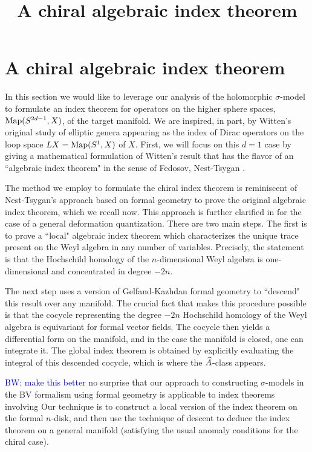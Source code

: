 \documentclass[10pt]{amsart}
\title{A chiral algebraic index theorem}
\def\brian{\textcolor{blue}{BW: }\textcolor{blue}}
\begin{document}
\maketitle

\section{A chiral algebraic index theorem}

In this section we would like to leverage our analysis of the holomorphic $\sigma$-model to formulate an index theorem for operators on the higher sphere spaces, ${\rm Map}(S^{2d-1}, X)$, of the target manifold. 
We are inspired, in part, by Witten's original study of elliptic genera appearing as the index of Dirac operators on the loop space $LX = {\rm Map}(S^1, X)$ of $X$\cite{WittenDirac,WittenElliptic}.
First, we will focus on this $d = 1$ case by giving a mathematical formulation of Witten's result that has the flavor of an ``algebraic index theorem" in the sense of Fedosov, Nest-Tsygan \cite{Fedosov, NestTsygan}. 

The method we employ to formulate the chiral index theorem is reminiscent of Nest-Tsygan's \cite{NestTsygan} approach based on formal geometry to prove the original algebraic index theorem, which we recall now. 
This approach is further clarified in \cite{FFS} for the case of a general deformation quantization. 
There are two main steps.
The first is to prove a ``local" algebraic index theorem which characterizes the unique trace present on the Weyl algebra in any number of variables.
Precisely, the statement is that the Hochschild homology of the $n$-dimensional Weyl algebra is one-dimensional and concentrated in degree $-2n$. 

The next step uses a version of Gelfand-Kazhdan formal geometry to ``descend" this result over any manifold. 
The crucial fact that makes this procedure possible is that the cocycle representing the degree $-2n$ Hochschild homology of the Weyl algebra is equivariant for formal vector fields. 
The cocycle then yields a differential form on the manifold, and in the case the manifold is closed, one can integrate it.
The global index theorem is obtained by explicitly evaluating the integral of this descended cocycle, which is where the $\Hat{A}$-class appears.

\brian{make this better} no surprise that our approach to constructing $\sigma$-models in the BV formalism using formal geometry is applicable to index theorems involving 
Our technique is to construct a local version of the index theorem on the formal $n$-disk, and then use the technique of descent to deduce the index theorem on a general manifold (satisfying the usual anomaly conditions for the chiral case). 
\end{document}
